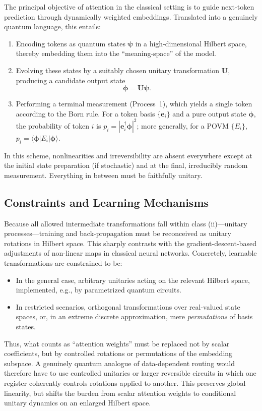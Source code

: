\documentclass[%
  reprint,
  superscriptaddress,
  showpacs,
  showkeys,
  amsmath,amssymb,
  pra,
  longbibliography,
  floatfix,
  x11names
]{revtex4-2}
\begin{document}
The principal objective of attention in the classical setting is to guide
next-token prediction through dynamically weighted embeddings.
Translated into a genuinely quantum language, this entails:
\begin{enumerate}
    \item Encoding tokens as quantum states $\bm{\psi}$
    in a high-dimensional Hilbert space,
    thereby embedding them into the ``meaning-space'' of the model.
    \item Evolving these states by a suitably chosen unitary transformation $\bm{U}$,
    producing a candidate output state
    \begin{equation}
    \bm{\phi} = \bm{U} \bm{\psi}.
    \end{equation}
    \item Performing a terminal measurement (Process~1),
    which yields a single token according to the Born rule.
    For a token basis $\{\bm{e}_i\}$ and a pure output state
    $\bm{\phi}$, the probability of token $i$ is
    $p_i=|\bm{e}_i^\dagger \bm{\phi}|^{2}$; more generally,
    for a POVM $\{E_i\}$, $p_i=\langle \bm{\phi}|E_i|\bm{\phi}\rangle$.
\end{enumerate}
In this scheme, nonlinearities and irreversibility are absent everywhere
except at the initial state preparation (if stochastic) and at the final,
irreducibly random measurement. Everything in between must be faithfully
unitary.

\subsection{Constraints and Learning Mechanisms}

Because all allowed intermediate transformations fall within class (ii)---unitary
processes---training and back-propagation must be reconceived as
unitary rotations in Hilbert space. This sharply contrasts with the gradient-descent-based
adjustments of non-linear maps in classical neural networks.
Concretely, learnable transformations are constrained to be:
\begin{itemize}
    \item In the general case, arbitrary unitaries acting on the relevant Hilbert space,
    implemented, e.g., by parametrized quantum circuits.
    \item In restricted scenarios, orthogonal transformations over real-valued state spaces,
    or, in an extreme discrete approximation, mere \emph{permutations} of basis states.
\end{itemize}
Thus, what counts as ``attention weights'' must be replaced not by scalar coefficients,
but by controlled rotations or permutations of the embedding subspace.
A genuinely quantum analogue of data-dependent routing would therefore have to use controlled unitaries or larger reversible circuits in which one register coherently controls rotations applied to another.
This preserves global linearity, but shifts the burden from scalar attention weights to conditional unitary dynamics on an enlarged Hilbert space.
\end{document}
